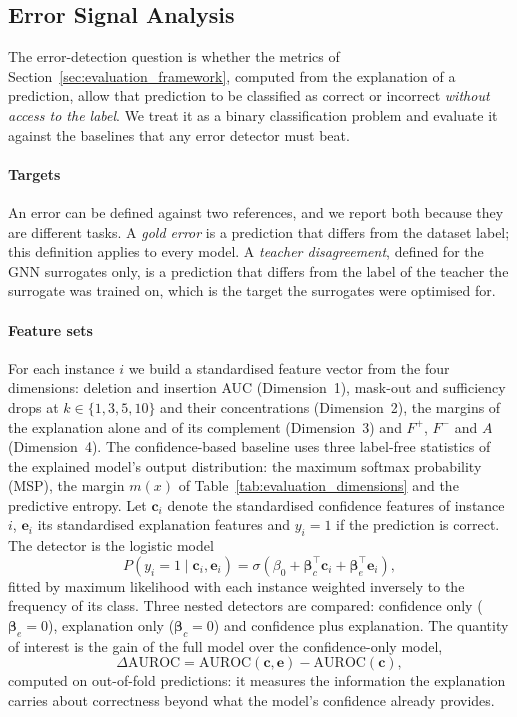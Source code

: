 \subsection{Error Signal Analysis} \label{logistic_regression}

The error-detection question is whether the metrics of Section~\ref{sec:evaluation_framework}, computed from the explanation of a prediction, allow that prediction to be classified as correct or incorrect \emph{without access to the label}. We treat it as a binary classification problem and evaluate it against the baselines that any error detector must beat.

\paragraph{Targets}
An error can be defined against two references, and we report both because they are different tasks. A \emph{gold error} is a prediction that differs from the dataset label; this definition applies to every model. A \emph{teacher disagreement}, defined for the GNN surrogates only, is a prediction that differs from the label of the teacher the surrogate was trained on, which is the target the surrogates were optimised for.

\paragraph{Feature sets}
For each instance \(i\) we build a standardised feature vector from the four dimensions: deletion and insertion AUC (Dimension~1), mask-out and sufficiency drops at \(k\in\{1,3,5,10\}\) and their concentrations (Dimension~2), the margins of the explanation alone and of its complement (Dimension~3) and \(F^{+}\), \(F^{-}\) and \(A\) (Dimension~4). The confidence-based baseline uses three label-free statistics of the explained model's output distribution: the maximum softmax probability (MSP), the margin \(m(x)\) of Table~\ref{tab:evaluation_dimensions} and the predictive entropy. Let \(\mathbf{c}_i\) denote the standardised confidence features of instance \(i\), \(\mathbf{e}_i\) its standardised explanation features and \(y_i=1\) if the prediction is correct. The detector is the logistic model
\begin{equation}
P(y_i=1\mid \mathbf{c}_i,\mathbf{e}_i)=\sigma\!\left(\beta_0+\boldsymbol{\beta}_c^{\top}\mathbf{c}_i+\boldsymbol{\beta}_e^{\top}\mathbf{e}_i\right),
\label{eq:detector}
\end{equation}
fitted by maximum likelihood with each instance weighted inversely to the frequency of its class. Three nested detectors are compared: confidence only (\(\boldsymbol{\beta}_e=0\)), explanation only (\(\boldsymbol{\beta}_c=0\)) and confidence plus explanation. The quantity of interest is the gain of the full model over the confidence-only model,
\begin{equation}
\Delta\mathrm{AUROC}=\mathrm{AUROC}(\mathbf{c},\mathbf{e})-\mathrm{AUROC}(\mathbf{c}),
\label{eq:delta}
\end{equation}
computed on out-of-fold predictions: it measures the information the explanation carries about correctness beyond what the model's confidence already provides.

